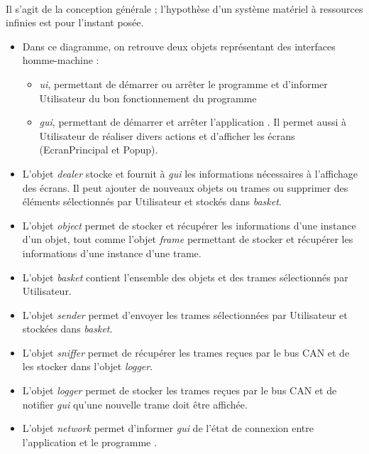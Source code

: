 \\

Il s'agit de la conception générale ; l'hypothèse d'un système matériel à ressources infinies est pour l'instant posée. 

\begin{itemize}
    \item Dans ce diagramme, on retrouve deux objets représentant des interfaces homme-machine : 
    \begin{itemize}
        \item \textit{ui}, permettant de démarrer ou arrêter le programme {\nomLogiciel} et d'informer Utilisateur du bon fonctionnement du programme 
        \item \textit{gui}, permettant de démarrer et arrêter l'application {\nomApplication}. Il permet aussi à Utilisateur de réaliser divers actions et d'afficher les écrans (EcranPrincipal et Popup).
    \end{itemize}

    \item L'objet \textit{dealer} stocke et fournit à \textit{gui} les informations nécessaires à l'affichage des écrans. Il peut ajouter de nouveaux objets ou trames ou supprimer des éléments sélectionnés par Utilisateur et stockés dans \textit{basket}.

    \item L'objet \textit{object} permet de stocker et récupérer les informations d'une instance d'un objet, tout comme l'objet \textit{frame} permettant de stocker et récupérer les informations d'une instance d'une trame.

    \item L'objet \textit{basket} contient l'ensemble des objets et des trames sélectionnés par Utilisateur.

    \item L'objet \textit{sender} permet d'envoyer les trames sélectionnées par Utilisateur et stockées dans \textit{basket}.

    \item L'objet \textit{sniffer} permet de récupérer les trames reçues par le bus CAN et de les stocker dans l'objet \textit{logger}. 

    \item L'objet \textit{logger} permet de stocker les trames reçues par le bus CAN et de notifier \textit{gui} qu'une nouvelle trame doit être affichée.

    \item L'objet \textit{network} permet d'informer \textit{gui} de l'état de connexion entre l'application {\nomApplication} et le programme {\nomLogiciel}.
\end{itemize}